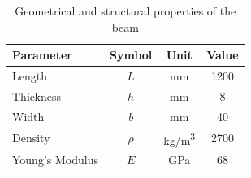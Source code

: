 \documentclass[20pt]{report}
\begin{document}
\begin{table}[h]
\centering
\renewcommand{\arraystretch}{1.4} %
\setlength{\tabcolsep}{13pt} %
\begin{tabular}{|l|c|c|c|}
\hline
\textbf{Parameter}      & \textbf{Symbol} & \textbf{Unit}  & \textbf{Value} \\ \hline
Length                  & \(L\)           & mm             & 1200           \\ \hline
Thickness               & \(h\)           & mm             & 8              \\ \hline
Width                   & \(b\)           & mm             & 40             \\ \hline
Density                 & \(\rho\)        & \si{kg/m^3}    & 2700           \\ \hline
Young's Modulus         & \(E\)           & GPa            & 68             \\ \hline
\end{tabular}
\caption{Geometrical and structural properties of the beam}
\label{table:beam_parameters}
\end{table}
\end{document}
